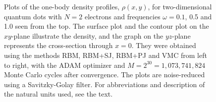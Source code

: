 \begin{landscape}
\begin{figure} [H]
		\caption{Plots of the one-body density profiles, $\rho(x,y)$, for two-dimensional quantum dots with $N=2$ electrons and frequencies $\omega=0.1$, 0.5 and 1.0 seen from the top. The surface plot and the contour plot on the $xy$-plane illustrate the density, and the graph on the $yz$-plane represents the cross-section through $x=0$. They were obtained using the methods RBM, RBM+SJ, RBM+PJ and VMC from left to right, with the ADAM optimizer and $M=2^{30}=1,073,741,824$ Monte Carlo cycles after convergence. The plots are noise-reduced using a Savitzky-Golay filter. For abbreviations and description of the natural units used, see the text.}
		\label{fig:OB2_interaction_2P}
	\end{figure}
	\begin{figure} [H]%
		\centering
		\captionsetup[subfigure]{labelformat=empty}
		\captionsetup{width=0.9\hsize}
		\hspace{0.cm}
		\hspace{-0.0cm}
		\hspace{-0.0cm}
		\hspace{-0.0cm}

\end{figure}
\end{landscape}
